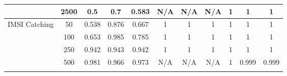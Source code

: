\begin{table*}[]
{\begin{tabular}{ccccccccccc}
			\multicolumn{1}{|c|}{}                                            & \multicolumn{1}{c|}{2500}          & \multicolumn{1}{c|}{0.5}                     & \multicolumn{1}{c|}{0.7}                  & \multicolumn{1}{c|}{0.583}            & \multicolumn{1}{c|}{N/A}                        & \multicolumn{1}{c|}{N/A}                     & \multicolumn{1}{c|}{N/A}                 & \multicolumn{1}{c|}{1}                      & \multicolumn{1}{c|}{1}                   & \multicolumn{1}{c|}{1}               \\ \hline
			\multicolumn{1}{|c|}{\multirow{6}{*}{IMSI Catching}}              & \multicolumn{1}{c|}{50}            & \multicolumn{1}{c|}{0.538}                   & \multicolumn{1}{c|}{0.876}                & \multicolumn{1}{c|}{0.667}            & \multicolumn{1}{c|}{1}                      & \multicolumn{1}{c|}{1}                   & \multicolumn{1}{c|}{1}               & \multicolumn{1}{c|}{1}                      & \multicolumn{1}{c|}{1}                   & \multicolumn{1}{c|}{1}               \\ \cline{2-11}
			\multicolumn{1}{|c|}{}                                            & \multicolumn{1}{c|}{100}           & \multicolumn{1}{c|}{0.653}                   & \multicolumn{1}{c|}{0.985}                & \multicolumn{1}{c|}{0.785}            & \multicolumn{1}{c|}{1}                        & \multicolumn{1}{c|}{1}                     & \multicolumn{1}{c|}{1}                 & \multicolumn{1}{c|}{1}                      & \multicolumn{1}{c|}{1}                   & \multicolumn{1}{c|}{1}               \\ \cline{2-11}
			\multicolumn{1}{|c|}{}                                            & \multicolumn{1}{c|}{250}           & \multicolumn{1}{c|}{0.942}                   & \multicolumn{1}{c|}{0.943}                & \multicolumn{1}{c|}{0.942}            & \multicolumn{1}{c|}{1}                        & \multicolumn{1}{c|}{1}                     & \multicolumn{1}{c|}{1}                 & \multicolumn{1}{c|}{1}                      & \multicolumn{1}{c|}{1}                   & \multicolumn{1}{c|}{1}               \\ \cline{2-11}
			\multicolumn{1}{|c|}{}                                            & \multicolumn{1}{c|}{500}           & \multicolumn{1}{c|}{0.981}                   & \multicolumn{1}{c|}{0.966}                & \multicolumn{1}{c|}{0.973}            & \multicolumn{1}{c|}{N/A}                      & \multicolumn{1}{c|}{N/A}                   & \multicolumn{1}{c|}{N/A}               & \multicolumn{1}{c|}{1}                      & \multicolumn{1}{c|}{0.999}               & \multicolumn{1}{c|}{0.999}           \\ \cline{2-11}

\end{tabular}}
\end{table*}
